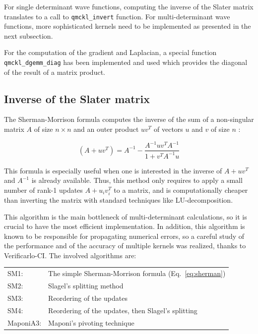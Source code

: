 For single determinant wave functions, computing the inverse of the Slater
matrix translates to a call to \texttt{qmckl_invert} function. For
multi-determinant wave functions, more sophisticated kernels need to be
implemented as presented in the next subsection.

For the computation of the gradient and Laplacian, a special function
\texttt{qmckl_dgemm_diag} has been implemented and used which provides
the diagonal of the result of a matrix product. 

\subsection{Inverse of the Slater matrix}

The Sherman-Morrison formula computes the inverse of the sum of a
non-singular matrix $A$ of size $n \times n$ and an outer product
$uv^T$ of vectors $u$ and $v$ of size $n$ :

\begin{equation}
    (A + uv^T) = A^{-1} - \frac{A^{-1} uv^T A^{-1}}{1 + v^T A^{-1} u}
    \label{eq:sherman}
\end{equation}

This formula is especially useful when one is interested in the
inverse of $A + uv^T$ and $A^{-1}$ is already available. Thus, this 
method only requires to apply a small number of rank-1 updates $A + u_i v_i^T$
to a matrix, and is computationally cheaper than inverting the matrix
with standard techniques like LU-decomposition.

This algorithm is the main bottleneck of multi-determinant
calculations, so it is crucial to have the most efficient
implementation. In addition, this algorithm is known to be responsible
for propagating numerical errors, so a careful study of the
performance and of the accuracy of multiple kernels was realized,
thanks to Verificarlo-CI. The involved algorithms are:
\begin{center}
\begin{tabular}{ll}
  SM1:      & The simple Sherman-Morrison formula (Eq.~\eqref{eq:sherman}) \\
  SM2:      & Slagel's splitting method\cite{slagel_splitting} \\
  SM3:      & Reordering of the updates \\
  SM4:      & Reordering of the updates, then Slagel's splitting \\
  MaponiA3: & Maponi's pivoting technique\cite{maponi} \\
\end{tabular}
\end{center}



